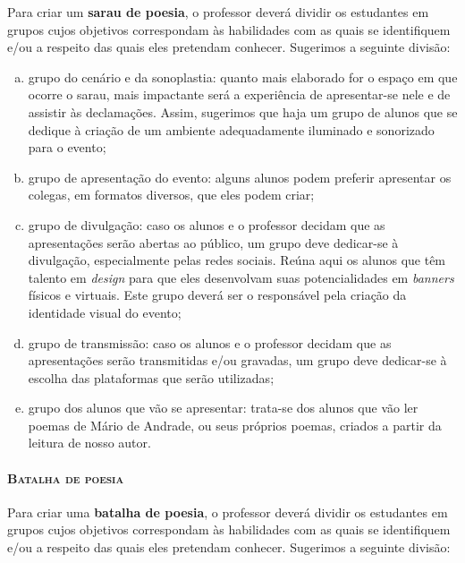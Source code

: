 \documentclass[11pt]{extarticle}
\begin{document}
Para criar um \textbf{sarau de poesia}, o professor deverá dividir os
estudantes em grupos cujos objetivos correspondam às habilidades com as
quais se identifiquem e/ou a respeito das quais eles pretendam conhecer.
Sugerimos a seguinte divisão:


\begin{enumerate}[(a)]

\item grupo do cenário e da sonoplastia: quanto mais elaborado for o espaço
em que ocorre o sarau, mais impactante será a experiência de
apresentar-se nele e de assistir às declamações. Assim, sugerimos que
haja um grupo de alunos que se dedique à criação de um ambiente
adequadamente iluminado e sonorizado para o evento;

\item grupo de apresentação do evento: alguns alunos podem preferir
apresentar os colegas, em formatos diversos, que eles podem criar;

\item grupo de divulgação: caso os alunos e o professor decidam que as
apresentações serão abertas ao público, um grupo deve dedicar-se à
divulgação, especialmente pelas redes sociais. Reúna aqui os alunos que
têm talento em \emph{design} para que eles desenvolvam suas
potencialidades em \emph{banners} físicos e virtuais. Este grupo deverá
ser o responsável pela criação da identidade visual do evento;

\item grupo de transmissão: caso os alunos e o professor decidam que as
apresentações serão transmitidas e/ou gravadas, um grupo deve dedicar-se
à escolha das plataformas que serão utilizadas;

\item grupo dos alunos que vão se apresentar: trata-se dos alunos que vão
ler poemas de Mário de Andrade, ou seus próprios poemas, criados a
partir da leitura de nosso autor.

\end{enumerate}


\paragraph{\textsc{Batalha de poesia}}

Para criar uma \textbf{batalha de poesia}, o professor deverá dividir os
estudantes em grupos cujos objetivos correspondam às habilidades com as
quais se identifiquem e/ou a respeito das quais eles pretendam conhecer.
Sugerimos a seguinte divisão:
\end{document}
